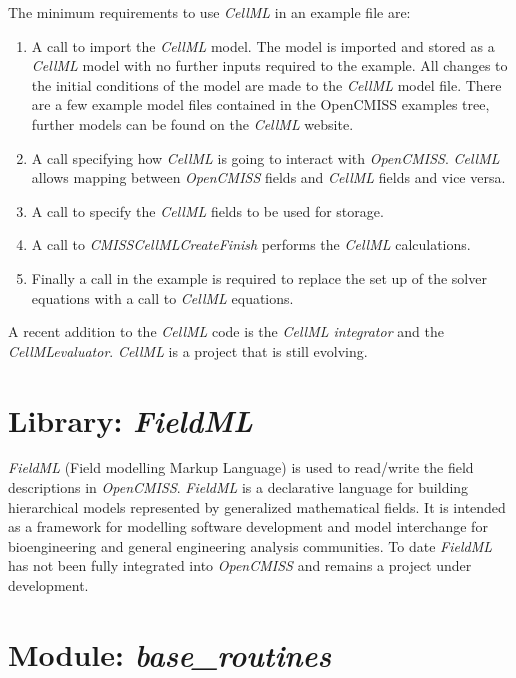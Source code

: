 The minimum requirements to use \emph{CellML} in an example file are: 

\begin{enumerate}
 \item A call to import the \emph{CellML} model. The model is imported and
stored as a \emph{CellML} model with no further inputs required to the 
example. All changes to the initial conditions of the model are made to 
the \emph{CellML} model file. There are a few example model files contained 
in the OpenCMISS examples tree, further models can be found on the 
\emph{CellML} website.
 \item A call specifying how \emph{CellML} is going to interact with
\emph{OpenCMISS}. \emph{CellML} allows mapping between \emph{OpenCMISS} 
fields and \emph{CellML} fields and vice versa. 
 \item A call to specify the \emph{CellML} fields to be used for storage. 
 \item A call to \emph{CMISSCellMLCreateFinish} performs the \emph{CellML}
calculations.
 \item Finally a call in the example is required to replace the set up of the
solver equations with a call to \emph{CellML} equations.
\end{enumerate}

\noindent A recent addition to the \emph{CellML} code is the \emph{CellML
integrator} and the \emph{CellMLevaluator}. \emph{CellML} is a project 
that is still evolving.


\section{Library: \emph{FieldML}}
\label{sec:fieldml}

\emph{FieldML} (Field modelling Markup Language) is used to read/write the
field descriptions in \emph{OpenCMISS}. \emph{FieldML} is a declarative 
language for building hierarchical models represented by generalized 
mathematical fields. It is intended as a framework for modelling software 
development and model interchange for bioengineering and general 
engineering analysis communities. To date \emph{FieldML} has not been 
fully integrated into \emph{OpenCMISS} and remains a project under 
development.


\section{Module: \emph{base\_routines}}
\label{sec:baseroutines}

